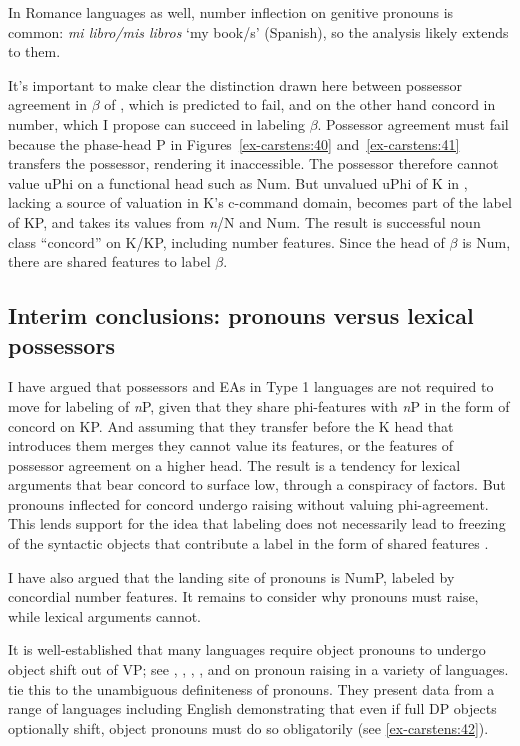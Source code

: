 \documentclass[output=paper
,modfonts
,nonflat]{langsci/langscibook}
\begin{document}
\noindent In Romance languages as well, number inflection on genitive pronouns is common: \textit{mi libro/mis libros} ‘my book/s’ (Spanish), so the analysis likely extends to them.

It’s important to make clear the distinction drawn here between possessor agreement in $\beta$ of , which is predicted to fail, and on the other hand concord in number, which I propose can succeed in labeling $\beta$. Possessor agreement must fail because the phase-head P in Figures~\ref{ex-carstens:40} and~\ref{ex-carstens:41} transfers the possessor, rendering it inaccessible. The possessor therefore cannot value uPhi on a functional head such as Num. But unvalued uPhi of K in , lacking a source of valuation in K’s c-command domain, becomes part of the label of KP, and takes its values from \textit{n}/N and Num. The result is successful noun class “concord” on K/KP, including number features. Since the head of $\beta$ is Num, there are shared features to label $\beta$.  

\subsection{Interim conclusions: pronouns versus lexical possessors} \label{sec-carstens:5.4}
I have argued that possessors and EAs in Type 1 languages are not required to move for labeling of \textit{n}P, given that they share phi-features with \textit{n}P in the form of concord on KP. And assuming that they transfer before the K head that introduces them merges they cannot value its features, or the features of possessor agreement on a higher head. The result is a tendency for lexical arguments that bear concord to surface low, through a conspiracy of factors. But pronouns inflected for concord undergo raising without valuing phi-agreement. This lends support for the idea that labeling does not necessarily lead to freezing of the syntactic objects that contribute a label in the form of shared features \citep{Chomsky2015}. 

I have also argued that the landing site of pronouns is NumP, labeled by concordial number features. It remains to consider why pronouns must raise, while lexical arguments cannot. 

It is well-established that many languages require object pronouns to undergo object shift out of VP; see \citet{Diesing1992, Diesing1997}, \citet{Diesing_Jelinek1995}, \citet{Roberts_Shlonsky1996}, \citet{Cardinaletti_Starke1999}, and \citet{Holmberg1999} on pronoun raising in a variety of languages.  \citet{Diesing_Jelinek1995} tie this to the unambiguous definiteness of pronouns. They present data from a range of languages including English demonstrating that even if full DP objects optionally shift, object pronouns must do so obligatorily (see \ref{ex-carstens:42}). 
\end{document}
